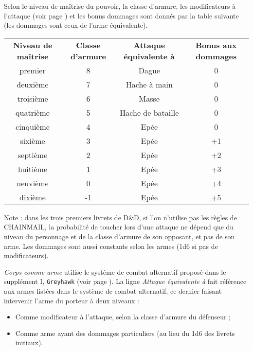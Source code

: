 \bigskip

Selon le niveau de maîtrise du pouvoir, la classe d'armure, les modificateurs à l'attaque (voir page \pageref{custom-combat-alternatif}) et les bonus dommages sont donnés par la table suivante (les dommages sont ceux de l'arme équivalente).

\bigskip

\begin{tabular}{cccc}
\textbf{Niveau de maîtrise} & \textbf{Classe d'armure} & \textbf{Attaque équivalente à} & \textbf{Bonus aux dommages}\\
premier     & 8  & Dague                & 0 \\
deuxième    & 7  & Hache à main         & 0 \\
troisième   & 6  & Masse                & 0 \\
quatrième   & 5  & Hache de bataille    & 0 \\
cinquième   & 4  & Epée                 & 0 \\
sixième     & 3  & Epée                 & +1 \\
septième    & 2  & Epée                 & +2 \\
huitième    & 1  & Epée                 & +3 \\
neuvième    & 0  & Epée                 & +4 \\
dixième     & -1 & Epée                 & +5 \\
\end{tabular}

\bigskip

Note : dans les trois premiers livrets de D\&D, si l'on n'utilise pas les règles de CHAINMAIL, la probabilité de toucher lors d'une attaque ne dépend que du niveau du personnage et de la classe d'armure de son opposant, et pas de son arme. Les dommages sont aussi constants selon les armes (1d6 si pas de modificateurs).

\bigskip

\textit{Corps comme arme} utilise le système de combat alternatif proposé dans le supplément I, \texttt{Greyhawk} (voir page \pageref{custom-combat-alternatif}). La ligne \textit{Attaque équivalente à} fait référence aux armes listées dans le système de combat alternatif, ce dernier faisant intervenir l'arme du porteur à deux niveaux :

\bigskip

\begin{itemize}
\item Comme modificateur à l'attaque, selon la classe d'armure du défenseur ;
\item Comme arme ayant des dommages particuliers (au lieu du 1d6 des livrets initiaux).
\end{itemize}

